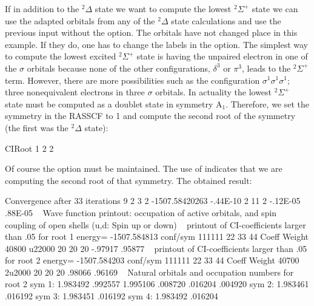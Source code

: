 If in addition to the $^2\Delta$ state we want to compute the lowest $^2\Sigma^+$
state we can use the adapted orbitals from any of the $^2\Delta$ state
calculations and use the previous  input without the 
 option. The orbitals have not changed place in this example.
If they do, one has to change the labels in the  option.
The simplest way to compute the lowest excited $^2\Sigma^+$ state
is having the unpaired electron in one of the $\sigma$ orbitals because none of
the other configurations, $\delta^3$ or $\pi^3$, leads to the $^2\Sigma^+$ term.
However, there are more possibilities such as the configuration
$\sigma^1$$\sigma^1$$\sigma^1$; three nonequivalent electrons in three
$\sigma$ orbitals. In actuality
the lowest $^2\Sigma^+$ state must be computed as a doublet state in symmetry
A$_1$. Therefore, we set the symmetry in the RASSCF to 1 and compute the second
root of the symmetry (the first was the $^2\Delta$ state):


\begin{inputlisting}
CIRoot
1 2
2
\end{inputlisting}

Of course the  option must be maintained.
The use of  indicates that we are computing the second root
of that symmetry. The obtained result:

\begin{sourcelisting}
      Convergence after  33 iterations
        9   2    3    2 -1507.58420263    -.44E-10   2  11 2  -.12E-05   .88E-05
~
                                  Wave function printout:
occupation of active orbitals, and spin coupling of open shells (u,d: Spin up or down)
~
      printout of CI-coefficients larger than   .05 for root   1
      energy=  -1507.584813
      conf/sym  111111 22 33 44     Coeff  Weight
         40800  u22000 20 20 20   -.97917  .95877
~
      printout of CI-coefficients larger than   .05 for root   2
      energy=  -1507.584203
      conf/sym  111111 22 33 44     Coeff  Weight
         40700  2u2000 20 20 20    .98066  .96169
~
      Natural orbitals and occupation numbers for root  2
      sym 1:   1.983492    .992557   1.995106    .008720    .016204    .004920
      sym 2:   1.983461    .016192
      sym 3:   1.983451    .016192
      sym 4:   1.983492    .016204
\end{sourcelisting}

